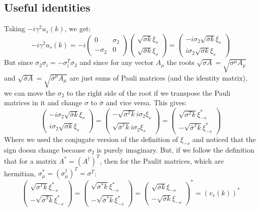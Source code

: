 \documentclass{article}
\begin{document}
\subsection{Useful identities}
Taking $-i\gamma^2u_s(k)$, we get:
\begin{equation}
    -i\gamma^2u_s(k) = -i
    \begin{pmatrix}
        0 & \sigma_2 \\ -\sigma_2 & 0
    \end{pmatrix}
    \begin{pmatrix} \sqrt{\sigma k} \xi_s \\ \sqrt{\bar{\sigma} k} \xi_s \end{pmatrix} =
    \begin{pmatrix} -i \sigma_2 \sqrt{\bar{\sigma} k} \xi_s \\ i \sigma_2 \sqrt{\sigma k} \xi_s \end{pmatrix}
\end{equation}
But since $\sigma_2\sigma_i = -\sigma_i^T\sigma_2$ and since for any vector $A_\mu$ the roots $\sqrt{\sigma A} = \sqrt{\sigma^\mu A_\mu}$ and $\sqrt{\bar{\sigma} A} = \sqrt{\bar{\sigma}^\mu A_\mu}$ are just sums of Pauli matrices (and the identity matrix), we can move the $\sigma_2$ to the right side of the root if we transpose the Pauli matrices in it and change $\sigma$ to $\bar{\sigma}$ and vice versa. This gives:
\begin{equation}
    \begin{pmatrix} -i \sigma_2 \sqrt{\bar{\sigma} k} \xi_s \\ i \sigma_2 \sqrt{\sigma k} \xi_s \end{pmatrix} =
    \begin{pmatrix} - \sqrt{\sigma^T k} i \sigma_2 \xi_s \\ \sqrt{\bar{\sigma}^T k} i \sigma_2 \xi_s \end{pmatrix} = 
    \begin{pmatrix} \sqrt{\sigma^T k} \xi_{-s}^* \\ -\sqrt{\bar{\sigma}^T k} \xi_{-s}^* \end{pmatrix}
\end{equation}
Where we used the conjugate version of the definition of $\xi_{-s}$ and noticed that the sign doesn change because $\sigma_2$ is purely imaginary. But, if we follow the definition that for a matrix $A^* = (A^\dagger)^T$, then for the Paulit matrices, which are hermitian, $\sigma_\mu^* = (\sigma_\mu^\dagger)^T = \sigma^T$:
\begin{equation}
    \begin{pmatrix} \sqrt{\sigma^T k} \xi_{-s}^* \\ -\sqrt{\bar{\sigma}^T k} \xi_{-s}^* \end{pmatrix} = 
    \begin{pmatrix} \sqrt{\sigma^* k} \xi_{-s}^* \\ -\sqrt{\bar{\sigma}^* k} \xi_{-s}^* \end{pmatrix} = 
    \begin{pmatrix} \sqrt{\sigma k} \xi_{-s} \\ -\sqrt{\bar{\sigma} k} \xi_{-s} \end{pmatrix}^* = (v_s(k))^*
\end{equation}
\end{document}
